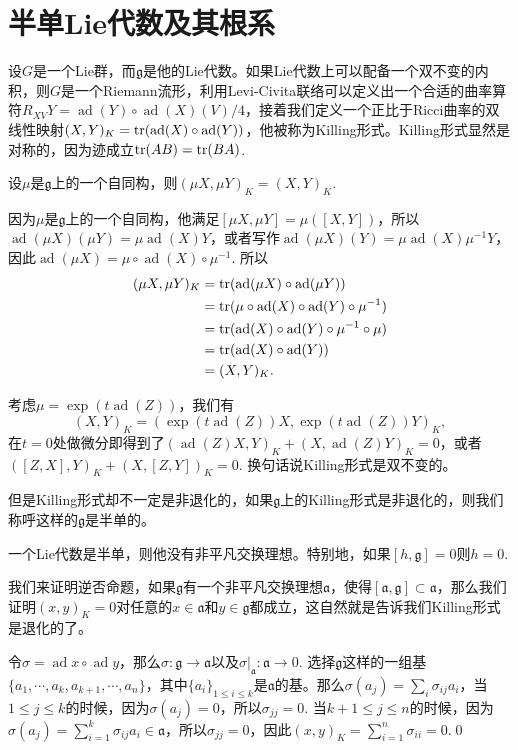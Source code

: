 \documentclass[9pt]{extarticle}
\newcommand{\lag}{{\mathfrak{g}}}
\DeclareMathOperator{\ad}{ad}
\begin{document}

\section{半单Lie代数及其根系}

\para 设$G$是一个Lie群，而$\lag$是他的Lie代数。如果Lie代数上可以配备一个双不变的内积，则$G$是一个Riemann流形，利用Levi-Civita联络可以定义出一个合适的曲率算符$R_{XV}Y=\ad(Y)\circ \ad(X)(V)/4$，接着我们定义一个正比于Ricci曲率的双线性映射$(X,Y)_K=\tr(\ad(X)\circ \ad(Y))$，他被称为Killing形式。Killing形式显然是对称的，因为迹成立$\operatorname{tr}(AB)=\operatorname{tr}(BA)$.

\para 设$\mu$是$\lag$上的一个自同构，则$(\mu X,\mu Y)_K=(X,Y)_K$.

因为$\mu$是$\lag$上的一个自同构，他满足$[\mu X,\mu Y]=\mu([X,Y])$，所以$\ad(\mu X)(\mu Y)=\mu\ad(X)Y$，或者写作$\ad(\mu X)(Y)=\mu\ad(X)\mu^{-1}Y$，因此$\ad(\mu X)=\mu\circ \ad(X)\circ \mu^{-1}$. 所以
\begin{align*}
	(\mu X,\mu Y)_K&=\tr(\ad(\mu X)\circ \ad(\mu Y))\\
	&=\tr(\mu\circ \ad(X)\circ \ad(Y)\circ \mu^{-1})\\&=\tr(\ad(X)\circ \ad(Y)\circ \mu^{-1}\circ \mu)\\&=\tr(\ad(X)\circ \ad(Y))\\&=(X,Y)_K.
\end{align*}

考虑$\mu=\exp(t\ad(Z))$，我们有
\[
	(X,Y)_K=(\exp(t\ad(Z))X,\exp(t\ad(Z))Y)_K,
\]
在$t=0$处做微分即得到了$(\ad(Z)X,Y)_K+(X,\ad(Z)Y)_K=0$，或者$([Z,X],Y)_K+(X,[Z,Y])_K=0$. 换句话说Killing形式是双不变的。

但是Killing形式却不一定是非退化的，如果$\lag$上的Killing形式是非退化的，则我们称呼这样的$\lag$是半单的。

\pro 一个Lie代数是半单，则他没有非平凡交换理想。特别地，如果$[h,\lag]=0$则$h=0$.

\proof 我们来证明逆否命题，如果$\lag$有一个非平凡交换理想$\mathfrak{a}$，使得$[\mathfrak{a},\lag]\subset \mathfrak{a}$，那么我们证明$(x,y)_K=0$对任意的$x\in \mathfrak{a}$和$y\in \lag$都成立，这自然就是告诉我们Killing形式是退化的了。

令$\sigma=\ad x\circ \ad y$，那么$\sigma:\lag\to \mathfrak{a}$以及$\sigma|_\mathfrak{a}:\mathfrak{a}\to 0$. 选择$\lag$这样的一组基$\{a_1,\cdots,a_k,a_{k+1},\cdots,a_{n}\}$，其中$\{a_i\}_{1\leq i \leq k}$是$\mathfrak{a}$的基。那么$\sigma(a_j)=\sum_i\sigma_{ij} a_i$，当$1\leq j\leq k$的时候，因为$\sigma(a_j)=0$，所以$\sigma_{jj}=0$. 当$k+1\leq j \leq n$的时候，因为$\sigma(a_j)=\sum_{i=1}^k\sigma_{ij} a_i\in\mathfrak{a}$，所以$\sigma_{jj}=0$，因此$(x,y)_K=\sum_{i=1}^n\sigma_{ii}=0$.\qed
\end{document}
